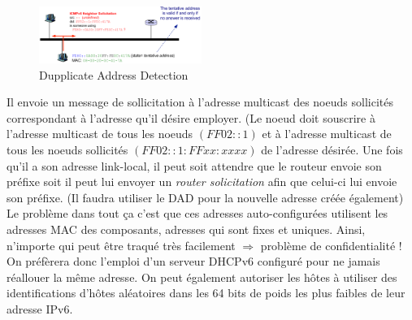 \documentclass{article}
\begin{document}
\begin{sffamily}
\begin{figure}[h!]
    \begin{center}
    \includegraphics[width=200px]{img_006.pdf}
    \caption{Dupplicate Address Detection}
    \end{center}	
\end{figure}

Il envoie un message de sollicitation à l'adresse multicast des noeuds sollicités correspondant à l'adresse qu'il désire 
employer. (Le noeud doit souscrire à l'adresse multicast de tous les noeuds $(FF02::1)$ et à l'adresse multicast de tous les 
noeuds sollicités $(FF02::1:FFxx:xxxx)$ de l'adresse désirée. Une fois qu'il a son adresse link-local, il peut soit attendre 
que le routeur envoie son préfixe soit il peut lui envoyer un \textit{router solicitation} afin que celui-ci lui envoie son 
préfixe. (Il faudra utiliser le DAD pour la nouvelle adresse créée également) \\

Le problème dans tout ça c'est que ces adresses auto-configurées utilisent les adresses MAC des composants, adresses qui sont 
fixes et uniques. Ainsi, n'importe qui peut être traqué très facilement $\Rightarrow$ problème de confidentialité ! On préfèrera 
donc l'emploi d'un serveur DHCPv6 configuré pour ne jamais réallouer la même adresse. On peut également autoriser les hôtes à
utiliser des identifications d'hôtes aléatoires dans les 64 bits de poids les plus faibles de leur adresse IPv6. \\


\end{sffamily}
\end{document}
